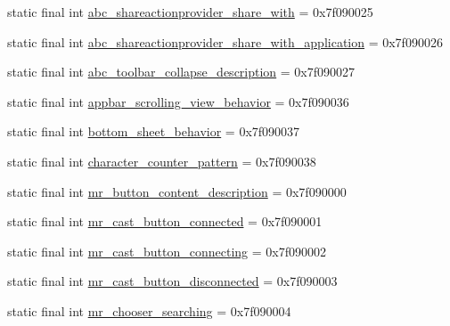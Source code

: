 \begin{CompactItemize}
\item 
static final int \hyperlink{classandroid_1_1support_1_1graphics_1_1drawable_1_1animated_1_1_r_1_1string_4020552064c6fbe9c0ef450c0dae0311}{abc\_\-shareactionprovider\_\-share\_\-with} = 0x7f090025
\item 
static final int \hyperlink{classandroid_1_1support_1_1graphics_1_1drawable_1_1animated_1_1_r_1_1string_31f6c616ccc51476facbdb39df619391}{abc\_\-shareactionprovider\_\-share\_\-with\_\-application} = 0x7f090026
\item 
static final int \hyperlink{classandroid_1_1support_1_1graphics_1_1drawable_1_1animated_1_1_r_1_1string_5b95f804396a69697190d065ec155ed0}{abc\_\-toolbar\_\-collapse\_\-description} = 0x7f090027
\item 
static final int \hyperlink{classandroid_1_1support_1_1graphics_1_1drawable_1_1animated_1_1_r_1_1string_16e7481ddd45af897a2c58ec4b8d1933}{appbar\_\-scrolling\_\-view\_\-behavior} = 0x7f090036
\item 
static final int \hyperlink{classandroid_1_1support_1_1graphics_1_1drawable_1_1animated_1_1_r_1_1string_18f5c931a3474556f3392ab18ebbc8ce}{bottom\_\-sheet\_\-behavior} = 0x7f090037
\item 
static final int \hyperlink{classandroid_1_1support_1_1graphics_1_1drawable_1_1animated_1_1_r_1_1string_c8686e5a241cdf111068b143476ec137}{character\_\-counter\_\-pattern} = 0x7f090038
\item 
static final int \hyperlink{classandroid_1_1support_1_1graphics_1_1drawable_1_1animated_1_1_r_1_1string_fe96c0fb1718fd66ff5bd6b5d309a2e3}{mr\_\-button\_\-content\_\-description} = 0x7f090000
\item 
static final int \hyperlink{classandroid_1_1support_1_1graphics_1_1drawable_1_1animated_1_1_r_1_1string_2e35ecbc9095cd828994f02b823c393f}{mr\_\-cast\_\-button\_\-connected} = 0x7f090001
\item 
static final int \hyperlink{classandroid_1_1support_1_1graphics_1_1drawable_1_1animated_1_1_r_1_1string_01ba7b48aa9bc141dad24b41032a43ad}{mr\_\-cast\_\-button\_\-connecting} = 0x7f090002
\item 
static final int \hyperlink{classandroid_1_1support_1_1graphics_1_1drawable_1_1animated_1_1_r_1_1string_3d33d524ffe8ce4678fb0e5d7cacb021}{mr\_\-cast\_\-button\_\-disconnected} = 0x7f090003
\item 
static final int \hyperlink{classandroid_1_1support_1_1graphics_1_1drawable_1_1animated_1_1_r_1_1string_58d9b40cef19b7edbc2755b8b0b35d69}{mr\_\-chooser\_\-searching} = 0x7f090004

\end{CompactItemize}
